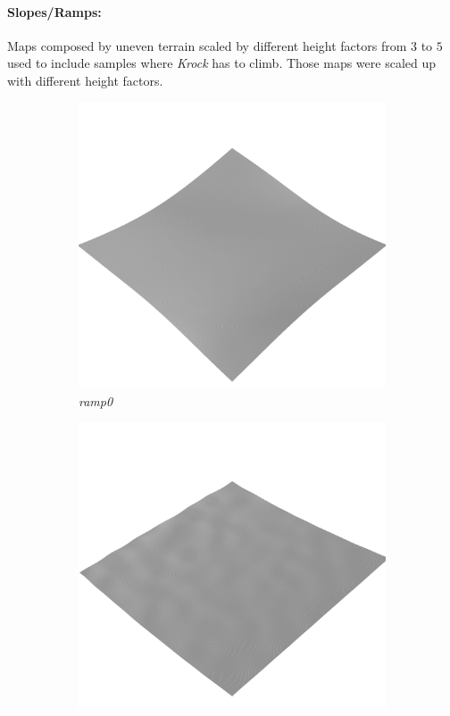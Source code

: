 \documentclass[../document.tex]{subfiles}
\begin{document}
\paragraph{Slopes/Ramps:} Maps composed by uneven terrain scaled by different height factors from $3$ to $5$ used to include samples where \emph{Krock} has to climb. Those maps were scaled up with different height factors.
\begin{figure}[H]
    \centering
        \begin{subfigure}[b]{0.32\textwidth}
            \includegraphics[width=\textwidth]{../img/hm3d/ramp0.png}
            \caption{\emph{ramp0}}
        \end{subfigure}
        \begin{subfigure}[b]{0.32\linewidth}
            \includegraphics[width=\textwidth]{../img/hm3d/ramp1.png}

\end{subfigure}
\end{figure}
\end{document}

